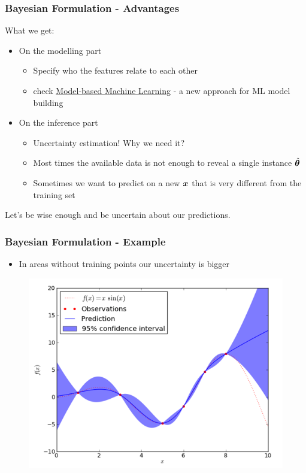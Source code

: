 \begin{frame}
  \frametitle{Bayesian Formulation - Advantages}
  What we get:
  \begin{itemize}
  \item On the modelling part
    \begin{itemize}
    \item Specify who the features relate to each other
    \item check \href{https://www.mbmlbook.com/}{Model-based Machine Learning} - a new approach for ML model building
    \end{itemize}
  \item On the inference part
    \begin{itemize}
    \item Uncertainty estimation! Why we need it?
    \item Most times the available data is not enough to reveal a single instance $\hat{\boldsymbol{\theta}}$
    \item Sometimes we want to predict on a new $\boldsymbol{x}$ that is very
      different from the training set
    \end{itemize}
  \end{itemize}
\noindent\makebox[\linewidth]{\rule{\paperwidth}{0.4pt}}
\alert{Let's be wise enough and be uncertain about our predictions.}
\end{frame}


\begin{frame}

  \frametitle{Bayesian Formulation - Example}  \begin{itemize}
    \item In areas without training points our uncertainty is bigger
  \end{itemize}


  \begin{figure}[ht]
    \centering
    \includegraphics[scale=0.5]{./images/gp.png}
    \label{fig:bayesian_predictive}
  \end{figure}
\end{frame}
